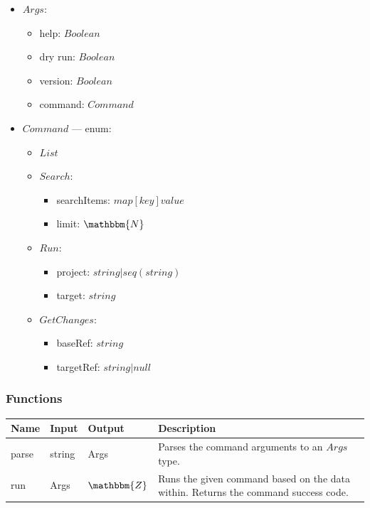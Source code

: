 \documentclass[11pt]{article}
\begin{document}
\begin{itemize}
\item $Args$:
  \begin{itemize}
  \item help: $Boolean$
  \item dry run: $Boolean$
  \item version: $Boolean$
  \item command: $Command$
  \end{itemize}
\item $Command$ --- enum:
  \begin{itemize}
  \item $List$
  \item $Search$:
    \begin{itemize}
    \item searchItems: $map[key]value$

    \item limit: $\mathbbm{N}$
    \end{itemize}
  \item $Run$:
    \begin{itemize}
    \item project: $string | seq(string)$
    \item target: $string$
    \end{itemize}
  \item $GetChanges$:
    \begin{itemize}
    \item baseRef: $string$
    \item targetRef: $string | null$
    \end{itemize}
  \end{itemize}
\end{itemize}

\subsubsection{Functions}

\begin{tabular}[h!]{l|l|l|p{6cm}}
  \textbf{Name} & \textbf{Input} & \textbf{Output} & \textbf{Description} \\
  \hline
  parse & string & Args & Parses the command arguments to an $Args$ type.\\
  \hline
  run & Args & $\mathbbm{Z}$ & Runs the given command based on the data within. Returns the command success code.
\end{tabular}

\vspace{2em}
\end{document}
